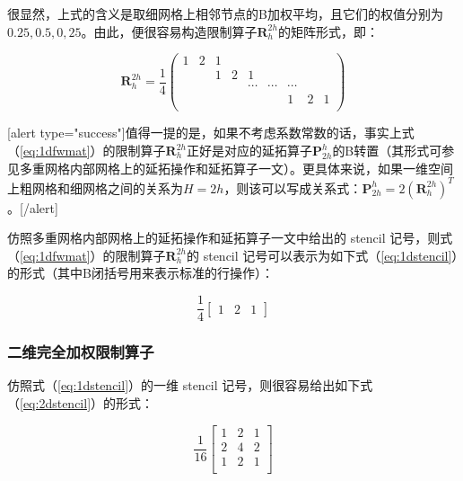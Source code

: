 \documentclass[12pt, UTF8, nofonts]{ctexart}
\begin{document}
很显然，上式的含义是取细网格上相邻节点的B加权平均，且它们的权值分别为$0.25,0.5,0,25$。由此，便很容易构造限制算子$\boldsymbol{R}_{h}^{2h}$的矩阵形式，即：

\begin{equation}
  \label{eq:1dfwmat}
  \boldsymbol{R}_{h}^{2h} = \dfrac{1}{4}
  \begin{pmatrix}
    1 & 2 & 1 & & & & & & \\
    & & 1 & 2 & 1 & & & & \\
    & & & & \cdots & \cdots & \cdots & & \\
    & & & & & & 1 & 2 & 1 \\
  \end{pmatrix}
\end{equation}

[alert type="success"]值得一提的是，如果不考虑系数常数的话，事实上式（\ref{eq:1dfwmat}）的限制算子$\boldsymbol{R}_{h}^{2h}$正好是对应的延拓算子$\boldsymbol{P}_{2h}^{h}$的B转置（其形式可参见多重网格内部网格上的延拓操作和延拓算子一文）。更具体来说，如果一维空间上粗网格和细网格之间的关系为$H=2h$，则该可以写成关系式：$\boldsymbol{P}_{2h}^{h} = 2 \left(\boldsymbol{R}_{h}^{2h}\right)^T$。[/alert]

仿照多重网格内部网格上的延拓操作和延拓算子一文中给出的 stencil 记号，则式（\ref{eq:1dfwmat}）的限制算子$\boldsymbol{R}_{h}^{2h}$的 stencil 记号可以表示为如下式（\ref{eq:1dstencil}）的形式（其中B闭括号用来表示标准的行操作）：

\begin{equation}
  \label{eq:1dstencil}
  \dfrac{1}{4}\begin{bmatrix} 1 & 2 & 1\end{bmatrix}
\end{equation}

\subsubsection*{二维完全加权限制算子}

仿照式（\ref{eq:1dstencil}）的一维 stencil 记号，则很容易给出如下式（\ref{eq:2dstencil}）的形式：

\begin{equation}
  \label{eq:2dstencil}
  \dfrac{1}{16}
  \begin{bmatrix}
    1 & 2 & 1 \\
    2 & 4 & 2 \\
    1 & 2 & 1 \\
  \end{bmatrix}
\end{equation}
\end{document}
